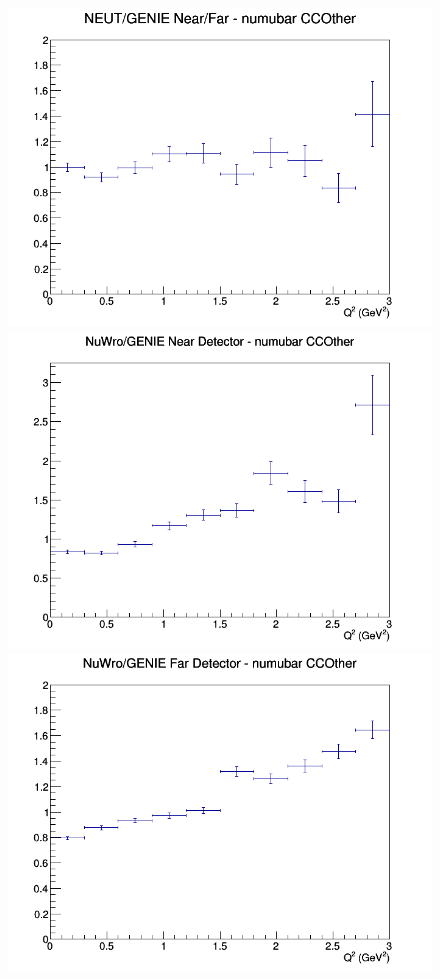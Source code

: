 \begin{figure}[h]
\endminipage
{}
\includegraphics[width=\linewidth]{eff_Q2/FGT/ratios/CCOther_NEUT_GENIE_numubar_NF_Q2.png}
\endminipage
\newline
{}
\includegraphics[width=\linewidth]{eff_Q2/FGT/ratios/CCOther_NuWro_GENIE_numubar_near_Q2.png}
\endminipage
{}
\includegraphics[width=\linewidth]{eff_Q2/FGT/ratios/CCOther_NuWro_GENIE_numubar_far_Q2.png}

\end{figure}
